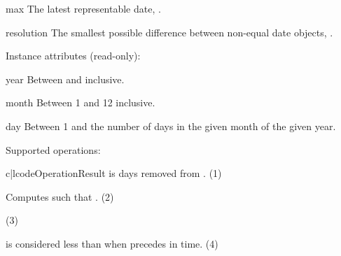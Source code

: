 \begin{memberdesc}{max}
  The latest representable date, .
\end{memberdesc}

\begin{memberdesc}{resolution}
  The smallest possible difference between non-equal date
  objects, .
\end{memberdesc}

Instance attributes (read-only):

\begin{memberdesc}{year}
  Between  and  inclusive.
\end{memberdesc}

\begin{memberdesc}{month}
  Between 1 and 12 inclusive.
\end{memberdesc}

\begin{memberdesc}{day}
  Between 1 and the number of days in the given month of the given
  year.
\end{memberdesc}

Supported operations:

\begin{tableii}{c|l}{code}{Operation}{Result}
    { is  days removed from
    .  (1)}


   {Computes  such that . (2)}

   {(3)}

   { is considered less than  when 
   precedes  in time. (4)}

\end{tableii}

